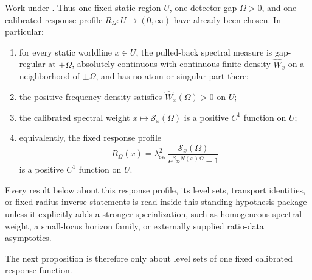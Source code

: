 \begin{assumption}\label{ass:response-standing-main}
Work under . Thus one fixed static region
$U$, one detector gap $\Omega>0$, and one calibrated response profile
$R_\Omega:U\to(0,\infty)$ have already been chosen. In particular:
\begin{enumerate}[label=\textup{(\roman*)},leftmargin=2.2em,itemsep=0.25em]
\item for every static worldline $x\in U$, the pulled-back spectral measure is
gap-regular at $\pm\Omega$, absolutely continuous with continuous finite
density $\widehat W_x$ on a neighborhood of $\pm\Omega$, and has no atom or
singular part there;
\item the positive-frequency density satisfies $\widehat W_x(\Omega)>0$ on $U$;
\item the calibrated spectral weight
$x\mapsto\mathcal S_x(\Omega)$ is a positive $C^1$ function on $U$;
\item equivalently, the fixed response profile
\[
R_\Omega(x)=
\lambda_{\mathrm{sw}}^2\,
\frac{\mathcal S_x(\Omega)}{e^{\beta_\infty N(x)\Omega}-1}
\]
is a positive $C^1$ function on $U$.
\end{enumerate}
Every result below about this response profile, its level sets, transport
identities, or fixed-radius inverse statements is read inside this standing
hypothesis package unless it explicitly adds a stronger specialization, such
as homogeneous spectral weight, a small-locus horizon family, or externally
supplied ratio-data asymptotics.
\end{assumption}

The next proposition is therefore only about level sets of one fixed calibrated
response function.

